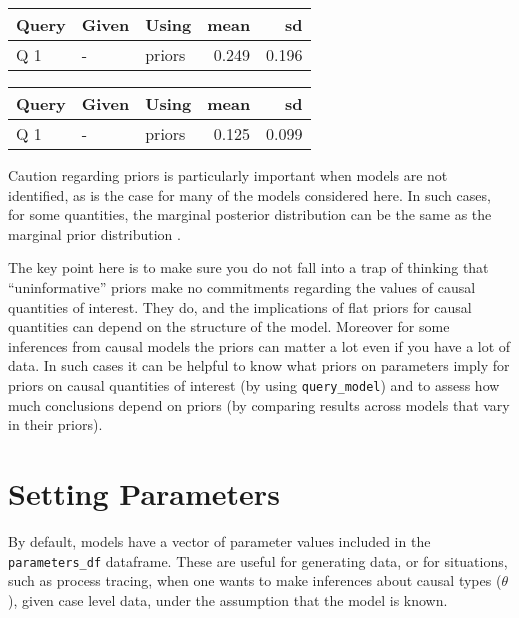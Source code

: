 \documentclass[
  12pt,
]{book}
\newenvironment{Shaded}{\begin{snugshade}}{\end{snugshade}}
\newcommand{\DataTypeTok}[1]{\textcolor[rgb]{0.13,0.29,0.53}{#1}}
\newcommand{\DecValTok}[1]{\textcolor[rgb]{0.00,0.00,0.81}{#1}}
\newcommand{\KeywordTok}[1]{\textcolor[rgb]{0.13,0.29,0.53}{\textbf{#1}}}
\newcommand{\NormalTok}[1]{#1}
\newcommand{\OperatorTok}[1]{\textcolor[rgb]{0.81,0.36,0.00}{\textbf{#1}}}
\newcommand{\StringTok}[1]{\textcolor[rgb]{0.31,0.60,0.02}{#1}}
\begin{document}
\begin{tabular}{l|l|l|r|r}
\hline
Query & Given & Using & mean & sd\\
\hline
Q 1 & - & priors & 0.249 & 0.196\\
\hline
\end{tabular}

\begin{Shaded}
\end{Shaded}

\begin{tabular}{l|l|l|r|r}
\hline
Query & Given & Using & mean & sd\\
\hline
Q 1 & - & priors & 0.125 & 0.099\\
\hline
\end{tabular}

Caution regarding priors is particularly important when models are not identified, as is the case for many of the models considered here. In such cases, for some quantities, the marginal posterior distribution can be the same as the marginal prior distribution \citep{poirier1998revising}.

The key point here is to make sure you do not fall into a trap of thinking that ``uninformative'' priors make no commitments regarding the values of causal quantities of interest. They do, and the implications of flat priors for causal quantities can depend on the structure of the model. Moreover for some inferences from causal models the priors can matter a lot even if you have a lot of data. In such cases it can be helpful to know what priors on parameters imply for priors on causal quantities of interest (by using \texttt{query\_model}) and to assess how much conclusions depend on priors (by comparing results across models that vary in their priors).

\hypertarget{parameters}{%
\section{Setting Parameters}\label{parameters}}

By default, models have a vector of parameter values included in the \texttt{parameters\_df} dataframe. These are useful for generating data, or for situations, such as process tracing, when one wants to make inferences about causal types (\(\theta\)), given case level data, under the assumption that the model is known.
\end{document}

